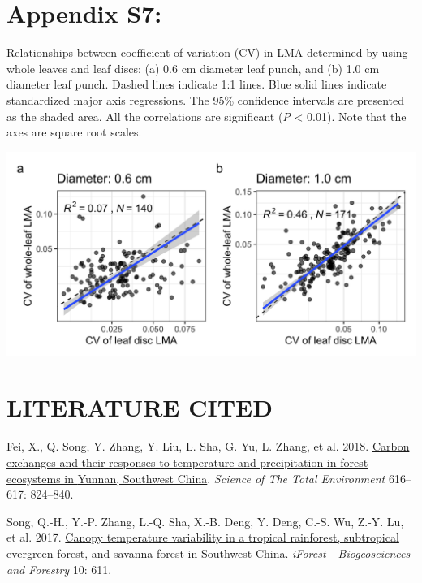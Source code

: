 \documentclass[
  12pt,
  a4paper,
,tablecaptionabove
]{scrartcl}
\newlength{\cslhangindent}
\newenvironment{CSLReferences}[2] %
 {%
  \setlength{\parindent}{0pt}
  \ifodd #1 \everypar{\setlength{\hangindent}{\cslhangindent}}\ignorespaces\fi
  \ifnum #2 > 0
  \setlength{\parskip}{#2\baselineskip}
  \fi
 }%
 {}
\begin{document}
\newpage

\hypertarget{appendix-s7}{%
\section{Appendix S7:}\label{appendix-s7}}

Relationships between coefficient of variation (CV) in LMA determined by
using whole leaves and leaf discs: (a) 0.6 cm diameter leaf punch, and
(b) 1.0 cm diameter leaf punch. Dashed lines indicate 1:1 lines. Blue
solid lines indicate standardized major axis regressions. The 95\%
confidence intervals are presented as the shaded area. All the
correlations are significant (\emph{P} \textless{} 0.01). Note that the
axes are square root scales.

\includegraphics[width=6.25in,height=\textheight]{../figs/fig_cv2.png}

\newpage

\hypertarget{literature-cited}{%
\section*{LITERATURE CITED}\label{literature-cited}}

\hypertarget{refs}{}
\begin{CSLReferences}{1}{0}
\leavevmode{}%
Fei, X., Q. Song, Y. Zhang, Y. Liu, L. Sha, G. Yu, L. Zhang, et al.
2018. \href{https://doi.org/10.1016/j.scitotenv.2017.10.239}{Carbon
exchanges and their responses to temperature and precipitation in forest
ecosystems in {Yunnan}, {Southwest China}}. \emph{Science of The Total
Environment} 616--617: 824--840.

\leavevmode{}%
Song, Q.-H., Y.-P. Zhang, L.-Q. Sha, X.-B. Deng, Y. Deng, C.-S. Wu,
Z.-Y. Lu, et al. 2017.
\href{https://doi.org/10.3832/ifor2223-010}{Canopy temperature
variability in a tropical rainforest, subtropical evergreen forest, and
savanna forest in {Southwest China}}. \emph{iForest - Biogeosciences and
Forestry} 10: 611.

\end{CSLReferences}
\end{document}
